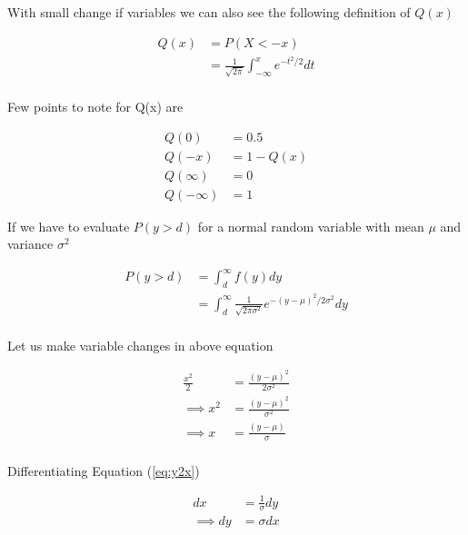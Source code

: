 \documentclass[a4paper]{article}
\numberwithin{equation}{subsection}
\begin{document}
	With small change if variables we can also see the following definition of $Q(x)$
	
	\begin{equation}\label{key}
	\begin{aligned}
	Q(x) &= P(X<-x) \\
	&=\frac{1}{\sqrt{2\pi}} \int_{-\infty}^x e^{-t^2/2} dt \\
	\end{aligned}
	\end{equation}
	
	Few points to note for Q(x) are
	
	\begin{equation*}\label{key}
	\begin{aligned}
	Q(0)&=0.5\\
	Q(-x)&=1-Q(x)\\
	Q(\infty)&=0\\
	Q(-\infty)&=1
	\end{aligned}
	\end{equation*}
	
	If we have to evaluate $P(y>d)$ for a normal random variable with mean $\mu$ and variance $\sigma^2$
	
	
	
	\begin{equation*}\label{}
	\begin{aligned}
	P(y>d)
	&= \int_d^\infty f(y)dy\\
	&= \int_d^\infty \frac{1}{\sqrt{2\pi \sigma^2}} e^{-(y-\mu)^2/ 2\sigma^2} dy\\
	\end{aligned}
	\end{equation*}
	
	Let us make variable changes in above equation
	
	\begin{equation}\label{eq:y2x}
	\begin{aligned}
	\frac{x^2}{2}&=\frac{(y-\mu)^2}{2\sigma^2}\\
	\implies x^2&=\frac{(y-\mu)^2}{\sigma^2} \\
	\implies x&=\frac{(y-\mu)}{\sigma} \\
	\end{aligned}
	\end{equation}
	
	Differentiating Equation (\ref{eq:y2x})
	
	\begin{equation}\label{key}
	\begin{aligned}
	dx &= \frac{1}{\sigma} dy \\
	\implies  dy &= \sigma dx
	\end{aligned}
	\end{equation}
	
\end{document}
